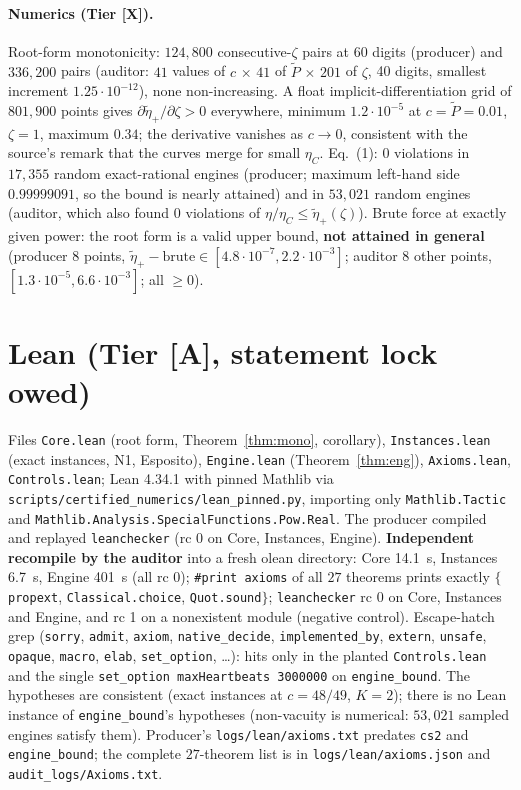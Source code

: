 \documentclass[10pt]{article}
\newcommand{\tier}[1]{\textsf{[#1]}}
\newcommand{\tA}{\tier{A}}
\newcommand{\tX}{\tier{X}}
\newcommand{\lean}[1]{\texttt{#1}}
\newcommand{\eC}{\eta_C}
\newcommand{\ep}{\tilde\eta_+}
\theoremstyle{plain}
\begin{document}
\paragraph{Numerics (Tier \tX{}).} Root-form monotonicity: $124{,}800$ consecutive-$\zeta$ pairs at 60 digits (producer) and $336{,}200$ pairs (auditor: $41$ values of $c$ $\times$ $41$ of $\tilde P$ $\times$ $201$ of $\zeta$, 40 digits, smallest increment $1.25\cdot10^{-12}$), none non-increasing. A float implicit-differentiation grid of $801{,}900$ points gives $\partial\ep/\partial\zeta>0$ everywhere, minimum $1.2\cdot10^{-5}$ at $c=\tilde P=0.01$, $\zeta=1$, maximum $0.34$; the derivative vanishes as $c\to0$, consistent with the source's remark that the curves merge for small $\eC$. Eq.~(1): $0$ violations in $17{,}355$ random exact-rational engines (producer; maximum left-hand side $0.99999091$, so the bound is nearly attained) and in $53{,}021$ random engines (auditor, which also found $0$ violations of $\eta/\eC\le\ep(\zeta)$). Brute force at exactly given power: the root form is a valid upper bound, \textbf{not attained in general} (producer $8$ points, $\ep-\text{brute}\in[4.8\cdot10^{-7},2.2\cdot10^{-3}]$; auditor $8$ other points, $[1.3\cdot10^{-5},6.6\cdot10^{-3}]$; all $\ge0$).

\section{Lean (Tier \tA{}, statement lock owed)}\label{sec:lean}
Files \texttt{Core.lean} (root form, Theorem~\ref{thm:mono}, corollary), \texttt{Instances.lean} (exact instances, N1, Esposito), \texttt{Engine.lean} (Theorem~\ref{thm:eng}), \texttt{Axioms.lean}, \texttt{Controls.lean}; Lean 4.34.1 with pinned Mathlib via \texttt{scripts/certified\_numerics/lean\_pinned.py}, importing only \texttt{Mathlib.Tactic} and \texttt{Mathlib.Analysis.SpecialFunctions.Pow.Real}. The producer compiled and replayed \texttt{leanchecker} (rc 0 on Core, Instances, Engine). \textbf{Independent recompile by the auditor} into a fresh olean directory: Core 14.1~s, Instances 6.7~s, Engine 401~s (all rc 0); \lean{\#print axioms} of all $27$ theorems prints exactly $\{$\lean{propext}, \lean{Classical.choice}, \lean{Quot.sound}$\}$; \texttt{leanchecker} rc 0 on Core, Instances and Engine, and rc 1 on a nonexistent module (negative control). Escape-hatch grep (\lean{sorry}, \lean{admit}, \lean{axiom}, \lean{native\_decide}, \lean{implemented\_by}, \lean{extern}, \lean{unsafe}, \lean{opaque}, \lean{macro}, \lean{elab}, \lean{set\_option}, \dots): hits only in the planted \texttt{Controls.lean} and the single \lean{set\_option maxHeartbeats 3000000} on \lean{engine\_bound}. The hypotheses are consistent (exact instances at $c=48/49$, $K=2$); there is no Lean instance of \lean{engine\_bound}'s hypotheses (non-vacuity is numerical: $53{,}021$ sampled engines satisfy them). Producer's \texttt{logs/lean/axioms.txt} predates \lean{cs2} and \lean{engine\_bound}; the complete $27$-theorem list is in \texttt{logs/lean/axioms.json} and \texttt{audit\_logs/Axioms.txt}.
\end{document}
